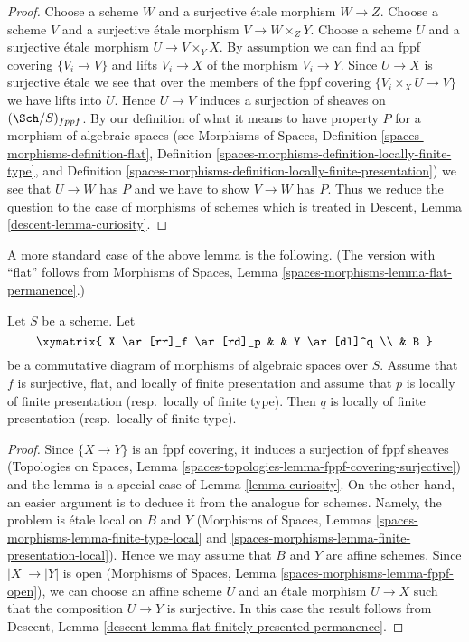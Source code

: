 \begin{proof}
Choose a scheme $W$ and a surjective \'etale morphism $W \to Z$.
Choose a scheme $V$ and a surjective \'etale morphism $V \to W \times_Z Y$.
Choose a scheme $U$ and a surjective \'etale morphism $U \to V \times_Y X$.
By assumption we can find an fppf covering $\{V_i \to V\}$ and
lifts $V_i \to X$ of the morphism $V_i \to Y$. Since $U \to X$ is surjective
\'etale we see that over the members of the fppf covering
$\{V_i \times_X U \to V\}$ we have lifts into $U$. Hence $U \to V$ induces
a surjection of sheaves on $(\Sch/S)_{fppf}$.
By our definition of what it means to have property $P$ for a
morphism of algebraic spaces (see
Morphisms of Spaces,
Definition \ref{spaces-morphisms-definition-flat},
Definition \ref{spaces-morphisms-definition-locally-finite-type}, and
Definition \ref{spaces-morphisms-definition-locally-finite-presentation})
we see that $U \to W$ has $P$ and we have to show $V \to W$ has $P$.
Thus we reduce the question to the case of morphisms of schemes
which is treated in
Descent, Lemma \ref{descent-lemma-curiosity}.
\end{proof}

\noindent
A more standard case of the above lemma is the following.
(The version with ``flat'' follows from
Morphisms of Spaces, Lemma \ref{spaces-morphisms-lemma-flat-permanence}.)

\begin{lemma}
\label{lemma-flat-finitely-presented-permanence}
Let $S$ be a scheme. Let
$$
\xymatrix{
X \ar[rr]_f \ar[rd]_p & &
Y \ar[dl]^q \\
& B
}
$$
be a commutative diagram of morphisms of algebraic spaces over $S$.
Assume that $f$ is surjective, flat, and locally of finite presentation
and assume that $p$ is locally of finite presentation (resp.\ locally
of finite type). Then $q$ is locally of finite presentation
(resp.\ locally of finite type).
\end{lemma}

\begin{proof}
Since $\{X \to Y\}$ is an fppf covering, it induces a surjection of
fppf sheaves (Topologies on Spaces, Lemma
\ref{spaces-topologies-lemma-fppf-covering-surjective}) and the
lemma is a special case of Lemma \ref{lemma-curiosity}.
On the other hand, an easier argument is to deduce it from
the analogue for schemes. Namely, the problem is \'etale local
on $B$ and $Y$ (Morphisms of Spaces, Lemmas
\ref{spaces-morphisms-lemma-finite-type-local} and
\ref{spaces-morphisms-lemma-finite-presentation-local}).
Hence we may assume that $B$ and $Y$ are affine
schemes. Since $|X| \to |Y|$ is open
(Morphisms of Spaces, Lemma \ref{spaces-morphisms-lemma-fppf-open}),
we can choose an affine
scheme $U$ and an \'etale morphism $U \to X$ such that the
composition $U \to Y$ is surjective. In this case the result
follows from Descent, Lemma
\ref{descent-lemma-flat-finitely-presented-permanence}.
\end{proof}

